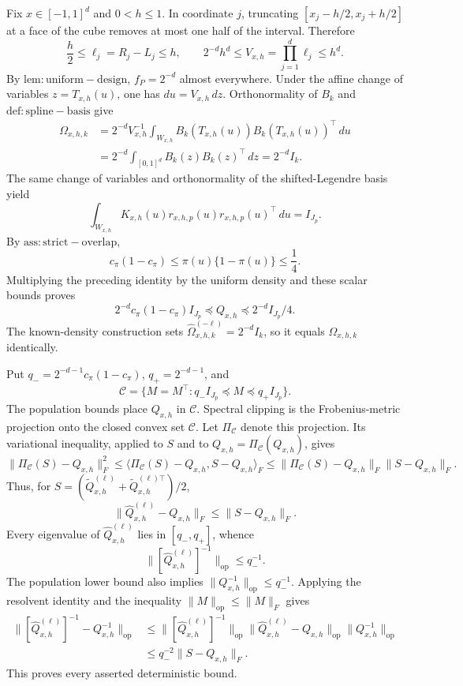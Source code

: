 Fix \(x\in[-1,1]^d\) and \(0<h\le1\). In coordinate \(j\), truncating \([x_j-h/2,x_j+h/2]\) at a face of the cube removes at most one half of the interval. Therefore
\[
\frac h2\le\ell_j=R_j-L_j\le h,
\qquad
2^{-d}h^d\le V_{x,h}=\prod_{j=1}^d\ell_j\le h^d.
\]
By \(\mathrm{lem:uniform-design}\), \(f_P=2^{-d}\) almost everywhere. Under the affine change of variables \(z=T_{x,h}(u)\), one has \(du=V_{x,h}\,dz\). Orthonormality of \(B_k\) and \(\mathrm{def:spline-basis}\) give
\[
\begin{aligned}
\Omega_{x,h,k}
&=2^{-d}V_{x,h}^{-1}\int_{W_{x,h}}B_k(T_{x,h}(u))B_k(T_{x,h}(u))^\top\,du\\
&=2^{-d}\int_{[0,1]^d}B_k(z)B_k(z)^\top\,dz
=2^{-d}I_k.
\end{aligned}
\]
The same change of variables and orthonormality of the shifted-Legendre basis yield
\[
\int_{W_{x,h}}K_{x,h}(u)r_{x,h,p}(u)r_{x,h,p}(u)^\top\,du=I_{J_p}.
\]
By \(\mathrm{ass:strict-overlap}\),
\[
c_\pi(1-c_\pi)\le\pi(u)\{1-\pi(u)\}\le\frac14.
\]
Multiplying the preceding identity by the uniform density and these scalar bounds proves
\[
2^{-d}c_\pi(1-c_\pi)I_{J_p}
\preceq Q_{x,h}
\preceq2^{-d}I_{J_p}/4.
\]
The known-density construction sets \(\widehat\Omega^{(-\ell)}_{x,h,k}=2^{-d}I_k\), so it equals \(\Omega_{x,h,k}\) identically.

Put \(q_-=2^{-d-1}c_\pi(1-c_\pi)\), \(q_+=2^{-d-1}\), and
\[
\mathcal C=\{M=M^\top:q_-I_{J_p}\preceq M\preceq q_+I_{J_p}\}.
\]
The population bounds place \(Q_{x,h}\) in \(\mathcal C\). Spectral clipping is the Frobenius-metric projection onto the closed convex set \(\mathcal C\). Let \(\Pi_{\mathcal C}\) denote this projection. Its variational inequality, applied to \(S\) and to \(Q_{x,h}=\Pi_{\mathcal C}(Q_{x,h})\), gives
\[
\|\Pi_{\mathcal C}(S)-Q_{x,h}\|_F^2
\le\langle\Pi_{\mathcal C}(S)-Q_{x,h},S-Q_{x,h}\rangle_F
\le\|\Pi_{\mathcal C}(S)-Q_{x,h}\|_F\|S-Q_{x,h}\|_F.
\]
Thus, for \(S=(\widetilde Q^{(\ell)}_{x,h}+\widetilde Q^{(\ell)\top}_{x,h})/2\),
\[
\|\widehat Q^{(\ell)}_{x,h}-Q_{x,h}\|_F\le\|S-Q_{x,h}\|_F.
\]
Every eigenvalue of \(\widehat Q^{(\ell)}_{x,h}\) lies in \([q_-,q_+]\), whence
\[
\|[\widehat Q^{(\ell)}_{x,h}]^{-1}\|_{\mathrm{op}}\le q_-^{-1}.
\]
The population lower bound also implies \(\|Q_{x,h}^{-1}\|_{\mathrm{op}}\le q_-^{-1}\). Applying the resolvent identity and the inequality \(\|M\|_{\mathrm{op}}\le\|M\|_F\) gives
\[
\begin{aligned}
\|[\widehat Q^{(\ell)}_{x,h}]^{-1}-Q_{x,h}^{-1}\|_{\mathrm{op}}
&\le \|[\widehat Q^{(\ell)}_{x,h}]^{-1}\|_{\mathrm{op}}
\|\widehat Q^{(\ell)}_{x,h}-Q_{x,h}\|_{\mathrm{op}}
\|Q_{x,h}^{-1}\|_{\mathrm{op}}\\
&\le q_-^{-2}\|S-Q_{x,h}\|_F.
\end{aligned}
\]
This proves every asserted deterministic bound.